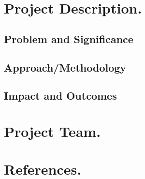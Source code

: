 \documentclass[11pt]{article} %
\begin{document}
\section{Project Description.}

\subsection{Problem and Significance}

\subsection{Approach/Methodology}
\subsection{Impact and Outcomes}
\section{Project Team.}
\section{References.}
\end{document}
